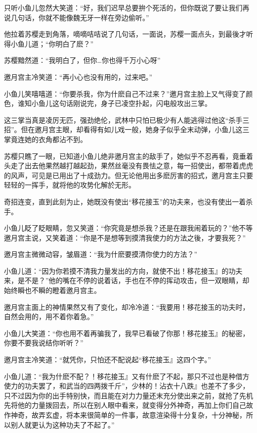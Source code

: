 \documentclass[12pt,oneside]{book}
\begin{document}
只听小鱼儿忽然大笑道：``好，我们迟早总要拚个死活的，但你既说了要让我们再说几句话，你就不能像魏无牙一样在旁边偷听。''

他拉着苏樱走到角落，嘀嘀咭咭说了几句话，一面说，苏樱一面点头，到最後才听得小鱼儿道；``你明白了麽？''

苏樱黯然道：``我明白了，但你\ldots 你也得千万小心呀''

邀月宫主冷笑道：``再小心也没有用的，过来吧。''

小鱼儿笑嘻嘻道：``你要杀我，你为什麽自己不过来？''邀月宫主脸上又气得变了颜色，谁知小鱼儿这句话刚说完，身子已凌空扑起，闪电般攻出三掌。

这三掌当真是凌厉无匹，强劲绝伦，武林中只怕已极少有人能逃得过他这``杀手三招''。但在邀月宫主眼，却看得有如儿戏一般，她身子似乎全末动弹，小鱼儿这三掌竟连她的衣角都沾不到。

苏樱只瞧了一眼，已知道小鱼儿绝非邀月宫主的敌手了，她似乎不忍再看，竟垂着头走了出去他果然越打越起劲，果然丝毫没有畏怯之意，每一招使出，都带着虎虎的风声，可见是已用出了十成劲力。但无论他用出多麽厉害的招式，邀月宫主只要轻轻的一挥手，就将他的攻势化解於无形。

奇招连变，直到此刻为止，她既没有使出``移花接玉''的功夫来，也没有使出一着杀手。

小鱼儿眨了眨眼睛，忽又笑道：``你究竟是想杀我？还是在跟我闹着玩的？''他不等邀月宫主说，又笑着道：``你是不是想等到摸清我使力的方法之後，才要我死？''

邀月宫主微微动容，皱眉道：``我为什麽要摸清你使力的方法？''

小鱼儿道：``因为你若摸不清我力量发出的方向，就使不出！移花接玉』的功夫来，是不是？''他的嘴在不停的说着话，手也在不停的挥动攻击，但一双眼睛，却始终瞬也不瞬的瞪着邀月宫主。

邀月宫主面上的神情果然又有了变化，却冷冷道：``我要用！移花接玉的功夫时，自然会用的，用不着你着急。''

小鱼儿大笑道：``你也用不着再骗我了，我早已看破了你那！移花接玉』的秘密，你要不要我说结你听听？''

邀月宫主冷笑道：``就凭你，只怕还不配说起``移花接玉』这四个字。''

小鱼儿道：``我为什麽不配？！移花接玉』又有什麽了不起，那只不过也是种借方使力的功夫罢了，和武当的四两拨千斤''，少林的！沾衣十八跌』也差不了多少，只不过因为你的出手特别快，而且能在对力力量还末充分使出来之前，就抢了先机先将他的力量拨回去，所以在别人眼中看来，就变得分外神奇，再加上你们自己故作神奇，故弄玄虚，将本来很简单的一件事，故意渲染得十分复杂，十分神秘，所以别人就更认为这种功夫了不起了。''
\end{document}
